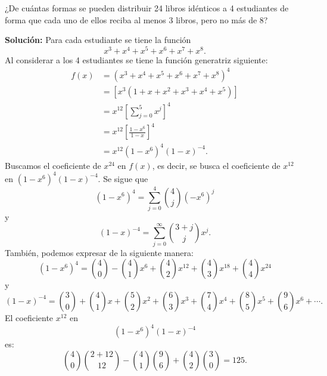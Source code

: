 \begin{myexample}
    ¿De cuántas formas se pueden distribuir 24 libros idénticos a 4 estudiantes de forma que cada uno de ellos reciba al menos 3 libros, pero no más de 8?

    \tcblower
    \textbf{\color{jblueleft}Solución:} Para cada estudiante se tiene la función
    $$x^3 + x^4 + x^5 + x^6 + x^7 + x^8.$$
    Al considerar a los 4 estudiantes se tiene la función generatriz siguiente:
    \begin{align*}
        f(x) & = \left( x^3 + x^4 + x^5 + x^6 + x^7 + x^8 \right)^4 \\
        & = \left[ x^3 \left( 1 + x + x^2 + x^3 + x^4 + x^5 \right)\right] \\
        & = x^{12} \left[ \sum_{j=0}^5 x^j \right]^4 \\
        & = x^{12} \left[ \frac{1-x^6}{1-x} \right]^4 \\
        & = x^{12} \left( 1-x^6 \right)^4 (1-x)^{-4}.
    \end{align*}
    Buscamos el coeficiente de $x^{24}$ en $f(x)$, es decir, se busca el coeficiente de $x^{12}$ en $\left( 1-x^6 \right)^4 (1-x)^{-4}$. Se sigue que
    $$\left( 1-x^6 \right)^4 = \sum_{j=0}^4 \binom{4}{j}(-x^6)^j$$
    y
    $$(1-x)^{-4} = \sum_{j=0}^{\infty} \binom{3+j}{j}x^j.$$
    También, podemos expresar de la siguiente manera:
    $$\left( 1-x^6 \right)^4 = \binom{4}{0} - \binom{4}{1}x^6 + \binom{4}{2}x^{12} + \binom{4}{3}x^{18} + \binom{4}{4}x^{24}$$
    y
    $$(1-x)^{-4} = \binom{3}{0} + \binom{4}{1}x + \binom{5}{2}x^{2} + \binom{6}{3}x^{3} + \binom{7}{4}x^{4} + \binom{8}{5}x^{5} + \binom{9}{6}x^{6} + \cdots.$$
    El coeficiente $x^{12}$ en
    $$\left( 1-x^6 \right)^4 (1-x)^{-4}$$
    es:
    $$\binom{4}{0} \binom{2+12}{12} - \binom{4}{1} \binom{9}{6} + \binom{4}{2} \binom{3}{0} = 125.$$
\end{myexample}

